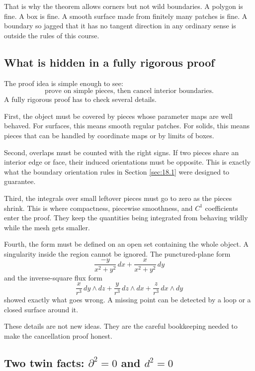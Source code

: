That is why the theorem allows corners but not wild boundaries.  A polygon is fine.
A box is fine.  A smooth surface made from finitely many patches is fine.  A boundary
so jagged that it has no tangent direction in any ordinary sense is outside the rules of
this course.

\subsection{What is hidden in a fully rigorous proof}

The proof idea is simple enough to see:
\[
    \text{prove on simple pieces, then cancel interior boundaries.}
\]
A fully rigorous proof has to check several details.

First, the object must be covered by pieces whose parameter maps are well behaved.
For surfaces, this means smooth regular patches.  For solids, this means pieces that can
be handled by coordinate maps or by limits of boxes.

Second, overlaps must be counted with the right signs.  If two pieces share an interior
edge or face, their induced orientations must be opposite.  This is exactly what the
boundary orientation rules in Section \ref{sec:18.1} were designed to guarantee.

Third, the integrals over small leftover pieces must go to zero as the pieces shrink.  This
is where compactness, piecewise smoothness, and \(C^1\) coefficients enter the proof.
They keep the quantities being integrated from behaving wildly while the mesh gets
smaller.

Fourth, the form must be defined on an open set containing the whole object.  A
singularity inside the region cannot be ignored.  The punctured-plane form
\[
    \frac{-y}{x^2+y^2}\,dx+\frac{x}{x^2+y^2}\,dy
\]
and the inverse-square flux form
\[
    \frac{x}{r^3}\,dy\wedge dz
    +
    \frac{y}{r^3}\,dz\wedge dx
    +
    \frac{z}{r^3}\,dx\wedge dy
\]
showed exactly what goes wrong.  A missing point can be detected by a loop or a closed
surface around it.

These details are not new ideas.  They are the careful bookkeeping needed to make the
cancellation proof honest.

\subsection{Two twin facts: \texorpdfstring{\(\partial^2=0\)}{boundary squared is zero}
and \texorpdfstring{\(d^2=0\)}{d squared is zero}}

